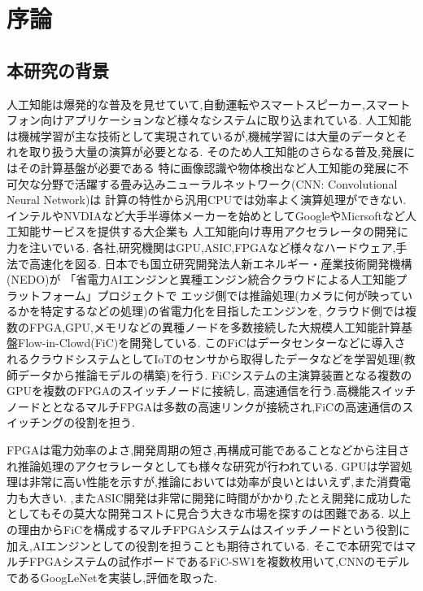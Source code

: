 \chapter{序論}
{
  \label{chap:introducion}

  \section{本研究の背景}
  \label{sec:backgroud}
  人工知能は爆発的な普及を見せていて,自動運転やスマートスピーカー,スマートフォン向けアプリケーションなど様々なシステムに取り込まれている.
  人工知能は機械学習が主な技術として実現されているが,機械学習には大量のデータとそれを取り扱う大量の演算が必要となる.
  そのため人工知能のさらなる普及,発展にはその計算基盤が必要である
  特に画像認識や物体検出など人工知能の発展に不可欠な分野で活躍する畳み込みニューラルネットワーク(CNN: Convolutional Neural Network)は
  計算の特性から汎用CPUでは効率よく演算処理ができない.
  インテルやNVDIAなど大手半導体メーカーを始めとしてGoogleやMicrsoftなど人工知能サービスを提供する大企業も
  人工知能向け専用アクセラレータの開発に力を注いでいる.
  各社,研究機関はGPU,ASIC,FPGAなど様々なハードウェア,手法で高速化を図る.
  日本でも国立研究開発法人新エネルギー・産業技術開発機構(NEDO)が
  「省電力AIエンジンと異種エンジン統合クラウドによる人工知能プラットフォーム」プロジェクトで
  エッジ側では推論処理(カメラに何が映っているかを特定するなどの処理)の省電力化を目指したエンジンを,
  クラウド側では複数のFPGA,GPU,メモリなどの異種ノードを多数接続した大規模人工知能計算基盤Flow-in-Clowd(FiC)を開発している.
  このFiCはデータセンターなどに導入されるクラウドシステムとしてIoTのセンサから取得したデータなどを学習処理(教師データから推論モデルの構築)を行う.
  FiCシステムの主演算装置となる複数のGPUを複数のFPGAのスイッチノードに接続し,
  高速通信を行う.高機能スイッチノードととなるマルチFPGAは多数の高速リンクが接続され,FiCの高速通信のスイッチングの役割を担う.

  FPGAは電力効率のよさ,開発周期の短さ,再構成可能であることなどから注目され推論処理のアクセラレータとしても様々な研究が行われている.
  GPUは学習処理は非常に高い性能を示すが,推論においては効率が良いとはいえず,また消費電力も大きい.
  ,またASIC開発は非常に開発に時間がかかり,たとえ開発に成功したとしてもその莫大な開発コストに見合う大きな市場を探すのは困難である.
  以上の理由からFiCを構成するマルチFPGAシステムはスイッチノードという役割に加え,AIエンジンとしての役割を担うことも期待されている.
  そこで本研究ではマルチFPGAシステムの試作ボードであるFiC-SW1を複数枚用いて,CNNのモデルであるGoogLeNet\cite{googlenet}を実装し,評価を取った.

}
